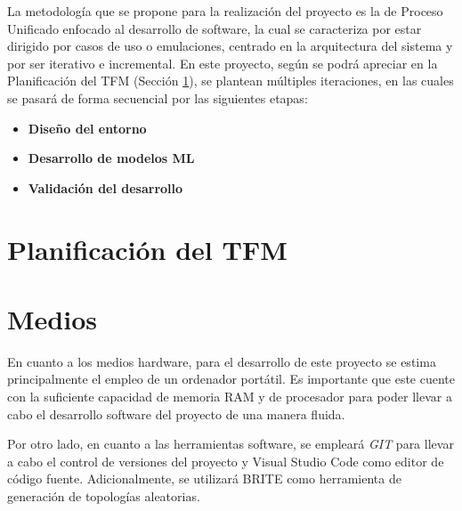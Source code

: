 \vspace{0.3cm}

La metodología que se propone para la realización del proyecto es la de Proceso Unificado enfocado al desarrollo de software, la cual se caracteriza por estar dirigido por casos de uso o emulaciones, centrado en la arquitectura del sistema y por ser iterativo e incremental. En este proyecto, según se podrá apreciar en la Planificación del TFM (Sección \ref{sec:planificacion}), se plantean múltiples iteraciones, en las cuales se pasará de forma secuencial por las siguientes etapas:

\begin{itemize}
    \item \textbf{Diseño del entorno} 
    \item \textbf{Desarrollo de modelos ML}
    \item \textbf{Validación del desarrollo}
\end{itemize}

\vspace{0.3cm}

\section{Planificación del TFM}
\label{sec:planificacion}


\section{Medios}

\vspace{0.3cm}
En cuanto a los medios hardware, para el desarrollo de este proyecto se estima principalmente el empleo de un ordenador portátil. Es importante que este cuente con la suficiente capacidad de memoria RAM y de procesador para poder llevar a cabo el desarrollo software del proyecto de una manera fluida.

\vspace{0.3cm}
Por otro lado, en cuanto a las herramientas software, se empleará \textit{GIT} para llevar a cabo el control de versiones del proyecto y Visual Studio Code como editor de código fuente. Adicionalmente, se utilizará BRITE como herramienta de generación de topologías aleatorias.

\newpage

